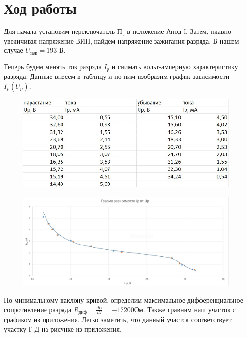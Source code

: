 \documentclass[a4paper,12pt]{article}
\begin{document}
\section*{Ход работы}
Для начала установим переключатель $\text{П}_1$ в положение \glqq Анод-I\grqq. Затем, плавно увеличивая напряжение ВИП, найдем напряжение зажигания разряда. В нашем случае $U_{\text{заж}} = 193$ В.

Теперь будем менять ток разряда $I_p$ и снимать вольт-амперную характеристику разряда. Данные внесем в таблицу и по ним изобразим график зависимости $I_p(U_p)$.

\begin{figure}[H]
	\begin{center}
    		\includegraphics[width=.5\textwidth]{tabliza1.jpg}
    	\end{center}
\end{figure}

\begin{figure}[H]
	\begin{center}    		
    		\includegraphics[width=1\textwidth]{graphik1.jpg}
    	\end{center}
\end{figure}

По минимальному наклону кривой, определим максимальное дифференциальное сопротивление разряда $R_{\text{диф}} = \frac{dU}{dI} = -13200$Ом. Также сравним наш участок с графиком из приложения. Легко заметить, что данный участок соответствует участку Г-Д на рисунке из приложения.
\end{document}

